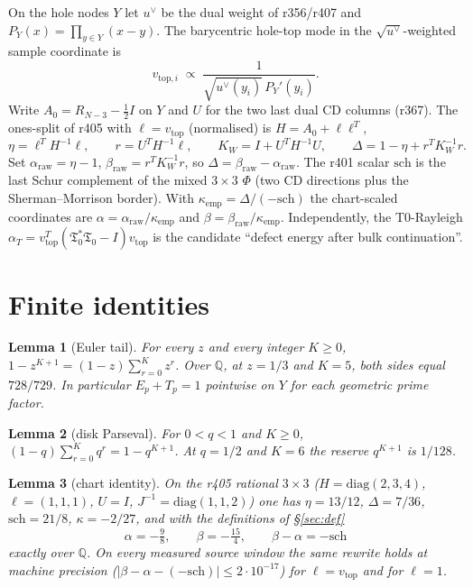 \documentclass[11pt]{article}
\newtheorem{lemma}{Lemma}
\theoremstyle{remark}
\newcommand{\Tfrak}{\mathfrak{T}}
\newcommand{\sch}{\mathrm{sch}}
\begin{document}
On the hole nodes $Y$ let $u^\vee$ be the dual weight of
r356/r407 and $P_Y(x)=\prod_{y\in Y}(x-y)$.
The barycentric hole-top mode in the $\sqrt{u^\vee}$-weighted
sample coordinate is
\begin{equation}\label{eq:vtop}
  v_{\mathrm{top},i}
  \;\propto\;
  \frac{1}{\sqrt{u^\vee(y_i)}\,P_Y'(y_i)}.
\end{equation}
Write $A_0=R_{N-3}-\tfrac12 I$ on $Y$ and $U$ for the two last
dual CD columns (r367).  The ones-split of r405 with
$\ell=v_{\mathrm{top}}$ (normalised) is
$H=A_0+\ell\ell^T$,
\[
  \eta=\ell^T H^{-1}\ell,\qquad
  r=U^T H^{-1}\ell,\qquad
  K_W=I+U^T H^{-1}U,\qquad
  \Delta=1-\eta+r^T K_W^{-1}r.
\]
Set $\alpha_{\mathrm{raw}}=\eta-1$,
$\beta_{\mathrm{raw}}=r^T K_W^{-1}r$, so
$\Delta=\beta_{\mathrm{raw}}-\alpha_{\mathrm{raw}}$.
The r401 scalar $\sch$ is the last Schur complement of the
mixed $3\times 3$ $\Phi$ (two CD directions plus the
Sherman--Morrison border).
With $\kappa_{\mathrm{emp}}=\Delta/(-\sch)$ the chart-scaled
coordinates are
$\alpha=\alpha_{\mathrm{raw}}/\kappa_{\mathrm{emp}}$ and
$\beta=\beta_{\mathrm{raw}}/\kappa_{\mathrm{emp}}$.
Independently, the T0-Rayleigh
$\alpha_T=v_{\mathrm{top}}^T(\Tfrak_0^*\Tfrak_0-I)v_{\mathrm{top}}$
is the candidate ``defect energy after bulk continuation''.

\section{Finite identities}\label{sec:satz}

\begin{lemma}[Euler tail]\label{lem:tail}
For every $z$ and every integer $K\ge 0$,
$1-z^{K+1}=(1-z)\sum_{r=0}^K z^r$.
Over $\mathbb{Q}$, at $z=1/3$ and $K=5$, both sides equal
$728/729$.
In particular $E_p+T_p=1$ \emph{pointwise} on $Y$ for each
geometric prime factor.
\end{lemma}

\begin{lemma}[disk Parseval]\label{lem:disk}
For $0<q<1$ and $K\ge 0$,
$(1-q)\sum_{r=0}^K q^r=1-q^{K+1}$.
At $q=1/2$ and $K=6$ the reserve $q^{K+1}$ is $1/128$.
\end{lemma}

\begin{lemma}[chart identity]\label{lem:ab}
On the r405 rational $3\times 3$
($H=\mathrm{diag}(2,3,4)$, $\ell=(1,1,1)$, $U=I$,
$J^{-1}=\mathrm{diag}(1,1,2)$) one has
$\eta=13/12$, $\Delta=7/36$, $\sch=21/8$,
$\kappa=-2/27$, and with the definitions of
\S\ref{sec:def}
\[
  \alpha=-\tfrac98,\qquad
  \beta=-\tfrac{15}{4},\qquad
  \beta-\alpha=-\sch
\]
exactly over $\mathbb{Q}$.
On every measured source window the same rewrite holds at
machine precision ($|\beta-\alpha-(-\sch)|\le 2\cdot 10^{-17}$)
for $\ell=v_{\mathrm{top}}$ and for $\ell=1$.
\end{lemma}
\end{document}
